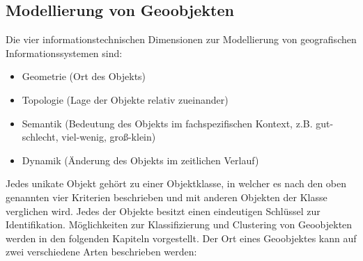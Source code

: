\documentclass[11pt,fleqn]{book} %
\begin{document}
\subsection{Modellierung von Geoobjekten}
Die vier informationstechnischen Dimensionen zur Modellierung von geografischen Informationssystemen sind:
\begin{itemize}
\item Geometrie (Ort des Objekts)
\item Topologie (Lage der Objekte relativ zueinander)
\item Semantik (Bedeutung des Objekts im fachspezifischen Kontext, z.B. gut-schlecht, viel-wenig, groß-klein)
\item Dynamik (Änderung des Objekts im zeitlichen Verlauf)
\end{itemize}
Jedes unikate Objekt gehört zu einer Objektklasse, in welcher es nach den oben genannten vier Kriterien beschrieben und mit anderen Objekten der Klasse verglichen wird. Jedes der Objekte besitzt einen eindeutigen Schlüssel zur Identifikation. Möglichkeiten zur Klassifizierung und Clustering von Geoobjekten werden in den folgenden Kapiteln vorgestellt.\newline
Der Ort eines Geoobjektes kann auf zwei verschiedene Arten beschrieben werden:
\end{document}
